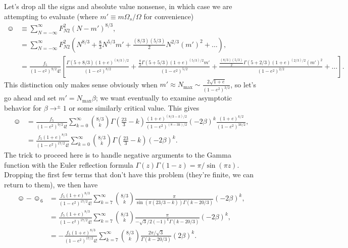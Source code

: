 \documentclass[11pt,
        usenames, %
        dvipsnames %
    ]{article}
\newcommand*{\p}[1]{\left(#1\right)}
\newcommand*{\s}[1]{\left[#1\right]}
\begin{document}
Let's drop all the signs and absolute value nonsense, in which case we are
attempting to evaluate (where $m' \equiv m\Omega_s / \Omega$ for convenience)
\begin{align}
    \smiley
        &\equiv \sum\limits_{N = -\infty}^\infty F_{N2}^2 \p{N - m'}^{8/3}
            ,\\
        &= \sum\limits_{N = -\infty}^\infty
            F_{N2}^2\p{N^{8/3} + \frac{8}{3}N^{5/3}m'
                + \frac{(8/3)(5/3)}{2}N^{2/3}(m')^2 + \dots},\\
        &= \frac{f_5}{\p{1 - e^2}^{9/2}4!}\s{
            \frac{\Gamma\p{5 + 8/3}\p{1 + e}^{(8/3) / 2}}{\p{1 - e^2}^{8/2}}
                + \frac{\frac{8}{3}\Gamma\p{5 + 5/3}\p{1 + e}^{(5/3) / 2}m'}{
                    \p{1 - e^2}^{5/2}}
                + \frac{\frac{(8/3)(5/3)}{2}\Gamma\p{5 + 2/3}\p{1 + e}^{(2/3)
                    / 2} (m')^2}{\p{1 - e^2}^{2/2}}
                + \dots}.
\end{align}
This distinction only makes sense obviously when $m' \approx N_{\max} \sim
\frac{2\sqrt{1 + e}}{\p{1 - e^2}^{3/2}}$, so let's go ahead and set $m' =
N_{\max}\beta$; we want eventually to examine asymptotic behavior for $\beta
\to^{\pm} 1$ or some similarly critical value. This gives
\begin{align}
    \smiley
        &= \frac{f_5}{\p{1 - e^2}^{9/2}4!}\sum\limits_{k = 0}^\infty
            \binom{8/3}{k}\Gamma\p{\frac{23}{3} - k}
                \frac{\p{1 + e}^{(8/3 - k) / 2}}{
                    \p{1 - e^2}^{(8 - 3k)/2}}
                \p{-2\beta}^k\frac{\p{1 + e}^{k / 2}}{\p{1 - e^2}^{3k / 2}},\\
        &= \frac{f_5\p{1 + e}^{8/3}}{\p{1 - e^2}^{17/2}4!}
            \sum\limits_{k = 0}^\infty
            \binom{8/3}{k}\Gamma\p{\frac{23}{3} - k}\p{-2\beta}^k.
\end{align}
The trick to proceed here is to handle negative arguments to the Gamma function
with the Euler reflection formula $\Gamma(z) \Gamma\p{1 - z} = \pi/\sin\p{\pi
z}$. Dropping the first few terms that don't have this problem (they're finite,
we can return to them), we then have
\begin{align}
    \smiley - \smiley_6
        &= \frac{f_5\p{1 + e}^{8/3}}{\p{1 - e^2}^{17/2}4!}
            \sum\limits_{k = 7}^\infty \binom{8/3}{k}
            \frac{\pi}{\sin \p{\pi\p{23/3 - k}}
                \Gamma\p{k - 20/3}}\p{-2\beta}^k,\\
        &= \frac{f_5\p{1 + e}^{8/3}}{\p{1 - e^2}^{17/2}4!}
            \sum\limits_{k = 7}^\infty \binom{8/3}{k}
            \frac{\pi}{-\sqrt{3}/2\p{-1}^k
                \Gamma\p{k - 20/3}}\p{-2\beta}^k,\\
        &= -\frac{f_5\p{1 + e}^{8/3}}{\p{1 - e^2}^{17/2}4!}
            \sum\limits_{k = 7}^\infty \binom{8/3}{k}
            \frac{2\pi/\sqrt{3}}{\Gamma\p{k - 20/3}}\p{2\beta}^k.
\end{align}
\end{document}
